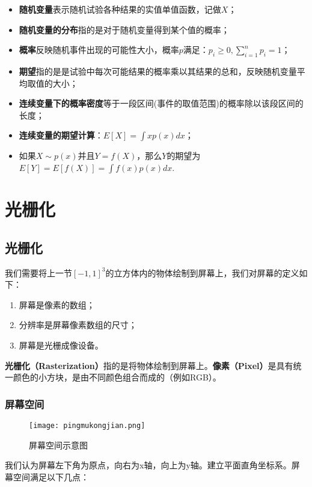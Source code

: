 \documentclass[openany]{progbookcn}
\begin{document}
\begin{itemize}
	\item \textbf{随机变量}表示随机试验各种结果的实值单值函数，记做$X$；
	\item \textbf{随机变量的分布}指的是对于随机变量得到某个值的概率；
	\item \textbf{概率}反映随机事件出现的可能性大小，概率$p$满足：$p_i\ge 0,\sum_{i=1}^{n}p_i=1$；
	\item \textbf{期望}指的是是试验中每次可能结果的概率乘以其结果的总和，反映随机变量平均取值的大小；
	\item \textbf{连续变量下的概率密度}等于一段区间(事件的取值范围)的概率除以该段区间的长度；
	\item \textbf{连续变量的期望计算}：$E[X]=\int xp(x)dx$；
	\item 如果$X\sim p(x)$并且$Y=f(X)$，那么$Y$的期望为$E[Y]=E[f(X)]=\int f(x)p(x)dx$.
\end{itemize}


\part{光栅化}

\chapter{光栅化}

我们需要将上一节$[-1,1]^3$的立方体内的物体绘制到屏幕上，我们对屏幕的定义如下：

\begin{enumerate}
	\item 屏幕是像素的数组；
	\item 分辨率是屏幕像素数组的尺寸；
	\item 屏幕是光栅成像设备。
\end{enumerate}

\textbf{光栅化（Rasterization）}指的是将物体绘制到屏幕上。\textbf{像素（Pixel）}是具有统一颜色的小方块，是由不同颜色组合而成的（例如RGB）。

\section{屏幕空间}

\begin{figure}[H]
	\centering
	\texttt{[image: pingmukongjian.png]}
	\caption{屏幕空间示意图}
	\label{fig:projection}
\end{figure}

我们认为屏幕左下角为原点，向右为x轴，向上为y轴。建立平面直角坐标系。屏幕空间满足以下几点：
\end{document}

